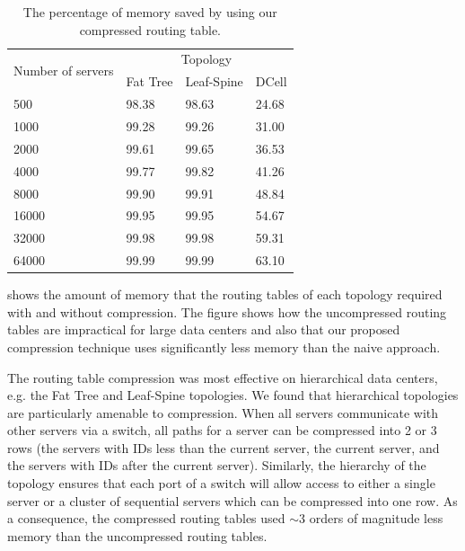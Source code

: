 \begin{table}[t]
    \caption{The percentage of memory saved by using our compressed routing table.}
    \label{tbl:percent_memory}

    \centering
    \begin{tabularx}{\linewidth}{lXXX}
        \toprule
        \multirow{2}{6em}{Number of servers} & \multicolumn{3}{c}{Topology}                      \\
        \cmidrule{2-4}
                                             & Fat Tree                     & Leaf-Spine & DCell \\
        \midrule
        500                                  & 98.38                        & 98.63      & 24.68 \\
        1000                                 & 99.28                        & 99.26      & 31.00 \\
        2000                                 & 99.61                        & 99.65      & 36.53 \\
        4000                                 & 99.77                        & 99.82      & 41.26 \\
        8000                                 & 99.90                        & 99.91      & 48.84 \\
        16000                                & 99.95                        & 99.95      & 54.67 \\
        32000                                & 99.98                        & 99.98      & 59.31 \\
        64000                                & 99.99                        & 99.99      & 63.10 \\
        \bottomrule
    \end{tabularx}
\end{table}

 shows the amount of memory that the routing tables of each topology required with and without compression. The figure shows how the uncompressed routing tables are impractical for large data centers and also that our proposed compression technique uses significantly less memory than the naive approach.

The routing table compression was most effective on hierarchical data centers, e.g. the Fat Tree and Leaf-Spine topologies. We found that hierarchical topologies are particularly amenable to compression. When all servers communicate with other servers via a switch, all paths for a server can be compressed into 2 or 3 rows (the servers with IDs less than the current server, the current server, and the servers with IDs after the current server). Similarly, the hierarchy of the topology ensures that each port of a switch will allow access to either a single server or a cluster of sequential servers which can be compressed into one row. As a consequence, the compressed routing tables used $\sim$3 orders of magnitude less memory than the uncompressed routing tables.

